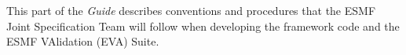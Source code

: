 
This part of the {\it Guide} describes conventions and procedures
that the ESMF Joint Specification Team will follow when developing 
the framework code and the ESMF VAlidation (EVA) Suite.




